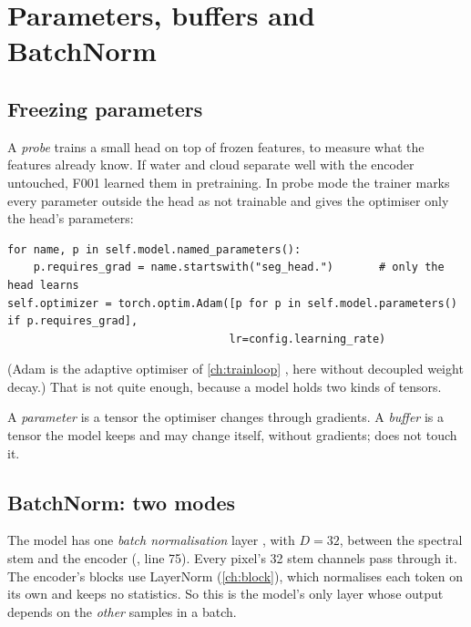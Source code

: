 \section{Parameters, buffers and BatchNorm}\label{sec:finetune:bn}

\subsection{Freezing parameters}

A \emph{probe} trains a small head on top of frozen features, to measure what the features already know. If water and cloud separate well
with the encoder untouched, F001 learned them in pretraining. In probe mode the trainer marks every parameter outside the head as not trainable and
gives the optimiser only the head's parameters:
\begin{lstlisting}
for name, p in self.model.named_parameters():
    p.requires_grad = name.startswith("seg_head.")       # only the head learns
self.optimizer = torch.optim.Adam([p for p in self.model.parameters() if p.requires_grad],
                                  lr=config.learning_rate)
\end{lstlisting}
(Adam is the adaptive optimiser of \cref{ch:trainloop} \citep{kingma2015adam}, here without decoupled weight decay.) That is not quite enough, because
a model holds two kinds of tensors.
\begin{definition}
A \emph{parameter} is a tensor the optimiser changes through gradients. A \emph{buffer} is a tensor the model keeps and may change itself, without
gradients;  does not touch it.
\end{definition}

\subsection{BatchNorm: two modes}

The model has one \emph{batch normalisation} layer \citep{ioffe2015batch},  with
$D = 32$, between the spectral stem and the encoder (, line 75). Every pixel's 32
stem channels pass through it. The encoder's blocks use LayerNorm (\cref{ch:block}), which normalises each token on its own and keeps no statistics.
So this is the model's only layer whose output depends on the \emph{other} samples in a batch.


